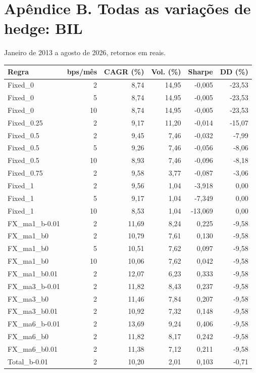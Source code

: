 \documentclass[11pt,a4paper]{article}
\begin{document}
\section*{Apêndice B. Todas as variações de hedge: BIL}Janeiro de 2013 a agosto de 2026, retornos em reais.\par \footnotesize\begin{center}\begin{tabular}{lrrrrr}\toprule
Regra & bps/mês & CAGR (\%) & Vol. (\%) & Sharpe & DD (\%) \\ \midrule
Fixed\_0 & 2 & 8,74 & 14,95 & -0,005 & -23,53 \\
Fixed\_0 & 5 & 8,74 & 14,95 & -0,005 & -23,53 \\
Fixed\_0 & 10 & 8,74 & 14,95 & -0,005 & -23,53 \\
Fixed\_0.25 & 2 & 9,17 & 11,20 & -0,014 & -15,07 \\
Fixed\_0.5 & 2 & 9,45 & 7,46 & -0,032 & -7,99 \\
Fixed\_0.5 & 5 & 9,26 & 7,46 & -0,056 & -8,06 \\
Fixed\_0.5 & 10 & 8,93 & 7,46 & -0,096 & -8,18 \\
Fixed\_0.75 & 2 & 9,58 & 3,77 & -0,087 & -3,06 \\
Fixed\_1 & 2 & 9,56 & 1,04 & -3,918 & 0,00 \\
Fixed\_1 & 5 & 9,17 & 1,04 & -7,349 & 0,00 \\
Fixed\_1 & 10 & 8,53 & 1,04 & -13,069 & 0,00 \\
FX\_ma1\_b-0.01 & 2 & 11,69 & 8,24 & 0,225 & -9,58 \\
FX\_ma1\_b0 & 2 & 10,79 & 7,61 & 0,130 & -9,58 \\
FX\_ma1\_b0 & 5 & 10,51 & 7,62 & 0,097 & -9,58 \\
FX\_ma1\_b0 & 10 & 10,06 & 7,62 & 0,042 & -9,58 \\
FX\_ma1\_b0.01 & 2 & 12,07 & 6,23 & 0,333 & -9,58 \\
FX\_ma3\_b-0.01 & 2 & 11,82 & 8,43 & 0,237 & -9,58 \\
FX\_ma3\_b0 & 2 & 11,46 & 7,84 & 0,207 & -9,58 \\
FX\_ma3\_b0.01 & 2 & 10,92 & 7,32 & 0,148 & -9,58 \\
FX\_ma6\_b-0.01 & 2 & 13,69 & 9,24 & 0,406 & -9,58 \\
FX\_ma6\_b0 & 2 & 11,82 & 8,17 & 0,242 & -9,58 \\
FX\_ma6\_b0.01 & 2 & 11,38 & 7,12 & 0,211 & -9,58 \\
Total\_b-0.01 & 2 & 10,20 & 2,01 & 0,103 & -0,71 \\

\end{tabular}
\end{center}
\end{document}
